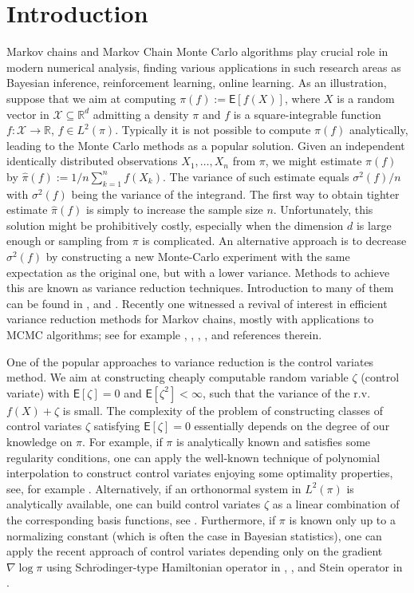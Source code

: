 \documentclass[bj]{imsart}
\def\PE{\mathsf{E}}
\def\rset{\mathbb{R}}
\def\rset{\mathbb{R}}
\begin{document}
\section{Introduction}
Markov chains and Markov Chain Monte Carlo algorithms play crucial role in modern numerical analysis, finding various applications in such research areas as Bayesian inference, reinforcement learning, online learning. As an illustration, suppose that we aim at computing $\pi(f):= \PE\left[f(X)\right]$, where $X$ is a random vector in $\mathcal{X} \subseteq \rset^d$ admitting a density $\pi$ and $f$ is a square-integrable function $f:\mathcal{X} \to \rset$, $f \in L^2(\pi)$. Typically it is not possible to compute $\pi(f)$ analytically, leading to the Monte Carlo methods as a popular solution. Given an independent identically distributed observations $X_1,\ldots,X_n$ from $\pi$, we might estimate $\pi(f)$ by $\hat{\pi}(f):=1/n\sum_{k=1}^{n}f(X_k)$. The variance of such estimate equals $\sigma^2(f)/n$  with $\sigma^2(f)$ being the variance of the integrand. The first way to obtain tighter estimate $\hat{\pi}(f)$ is simply to increase the sample size $n$. Unfortunately, this solution might be prohibitively costly, especially when the dimension $d$ is large enough or sampling from $\pi$ is complicated. An alternative approach is to decrease $\sigma^2(f)$ by constructing a new Monte-Carlo experiment with the same expectation as the original one, but with a lower variance. Methods to achieve this are known as variance
reduction techniques. Introduction to many of them can be found in \cite{rubinstein2016simulation}, \cite{GobetBook} and \cite{glasserman2013monte}. Recently one witnessed a revival of interest in efficient variance reduction methods  for Markov chains, mostly with applications to MCMC algorithms; see for example \cite{dellaportas2012control}, \cite{mira2013zero}, \cite{oates:girolami:chopin:2016}, \cite{south:mira:drovandi:2018}, \cite{brosse2018diffusion} and references therein.
\par
One of the popular approaches to variance reduction is the control variates method. We aim at constructing cheaply computable random variable $\zeta$ (control variate) with $\PE[\zeta] = 0$ and $\PE[\zeta^2] < \infty$, such that the variance of the r.v. $f(X) + \zeta$ is small. The complexity of the problem of constructing classes of control variates \(\zeta\) satisfying   $\PE[\zeta]=0$ essentially depends on the degree of our knowledge on \(\pi.\)
For example, if \(\pi\) is analytically known and satisfies some regularity conditions, one can apply the well-known technique of  polynomial interpolation to construct control variates enjoying  some optimality properties, see, for example \cite[Section~3.2]{dimov2008monte}. Alternatively, if an orthonormal system in \(L^2(\pi)\) is analytically available, one can build control variates \(\zeta\) as a linear combination of the corresponding basis functions, see \cite{GobetCV}. Furthermore, if \(\pi\) is known only up to a normalizing constant (which is often the case in Bayesian statistics), one can apply the recent approach of control variates  depending only on the gradient \(\nabla \log \pi\)  using Schr\(\ddot{\text{o}}\)dinger-type Hamiltonian operator in  \cite{assaraf1999zero}, \cite{mira2013zero}, and Stein operator in \cite{brosse2018diffusion}.
\end{document}
